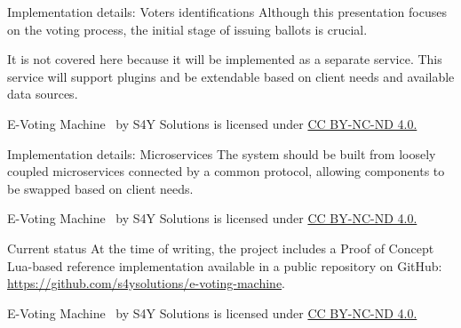 \documentclass[12pt]{beamer}
\newcommand{\currentyear}{\the\year} %
\newcommand{\copyrightnote}{
    \vfill
    \begin{flushleft}
    \tiny
    E-Voting Machine \textcopyright \currentyear~by S4Y Solutions is licensed under \href{https://creativecommons.org/licenses/by-nc-nd/4.0}{CC BY-NC-ND 4.0.}
    \end{flushleft}
}
\begin{document}
    \begin{frame}[allowframebreaks]{Implementation details: Voters identifications}
        \vfill
        Although this presentation focuses on the voting process, the initial stage of issuing ballots is crucial.

        It is not covered here because it will be implemented as a separate service. This service will support plugins
        and be extendable based on client needs and available data sources.
        \copyrightnote
    \end{frame}

    \begin{frame}[allowframebreaks]{Implementation details: Microservices}
        \vfill
        The system should be built from loosely coupled microservices connected by a common protocol,
        allowing components to be swapped based on client needs.
        \copyrightnote
    \end{frame}


    \begin{frame}[allowframebreaks]{Current status}
        \vfill
        At the time of writing, the project includes a Proof of Concept Lua-based reference
        implementation available in a public repository on
        GitHub: \url{https://github.com/s4ysolutions/e-voting-machine}.
        \copyrightnote
    \end{frame}
\end{document}
